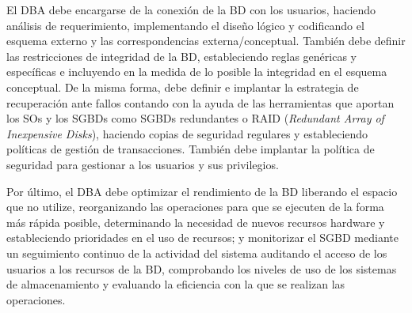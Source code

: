 El DBA debe encargarse de la conexión de la BD con los usuarios, haciendo análisis de requerimiento, implementando el diseño lógico y codificando el esquema externo y las correspondencias externa/conceptual.
También debe definir las restricciones de integridad de la BD, estableciendo reglas genéricas y específicas e incluyendo en la medida de lo posible la integridad en el esquema conceptual.
De la misma forma, debe definir e implantar la estrategia de recuperación ante fallos contando con la ayuda de las herramientas que aportan los SOs y los SGBDs como SGBDs redundantes o RAID (\textit{Redundant Array of Inexpensive Disks}), haciendo copias de seguridad regulares y estableciendo políticas de gestión de transacciones.
También debe implantar la política de seguridad para gestionar a los usuarios y sus privilegios.

Por último, el DBA debe optimizar el rendimiento de la BD liberando el espacio que no utilize, reorganizando las operaciones para que se ejecuten de la forma más rápida posible, determinando la necesidad de nuevos recursos hardware y estableciendo prioridades en el uso de recursos; y monitorizar el SGBD mediante un seguimiento continuo de la actividad del sistema auditando el acceso de los usuarios a los recursos de la BD, comprobando los niveles de uso de los sistemas de almacenamiento y evaluando la eficiencia con la que se realizan las operaciones.
